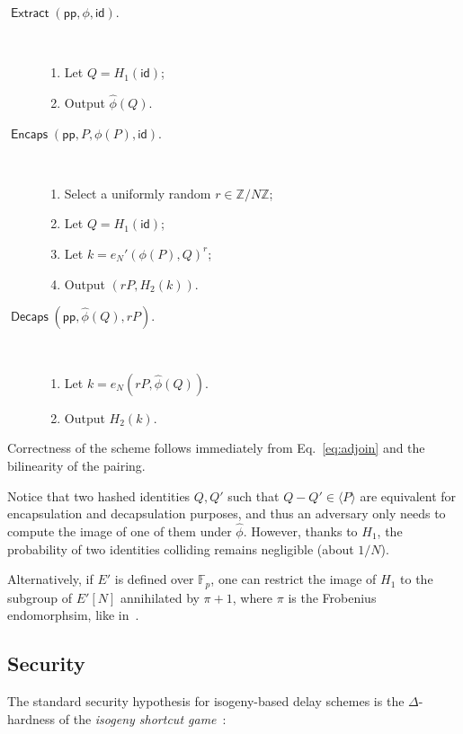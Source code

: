 \documentclass{llncs}
\newcommand{\Z}{\mathbb{Z}}
\newcommand{\F}{\mathbb{F}}
\DeclareMathOperator{\Extract}{\mathsf{Extract}}
\DeclareMathOperator{\Encaps}{\mathsf{Encaps}}
\DeclareMathOperator{\Decaps}{\mathsf{Decaps}}
\newcommand{\pp}{\mathsf{pp}}
\newcommand{\id}{\mathsf{id}}
\begin{document}
\begin{description}
\item[$\Extract(\pp,\phi,\id)$.]\
  \begin{enumerate}
  \item Let $Q = H_1(\id)$;
  \item Output $\hat\phi(Q)$.
  \end{enumerate}
\item[$\Encaps(\pp,P,\phi(P),\id)$.]\
  \begin{enumerate}
  \item Select a uniformly random $r\in\Z/N\Z$;
  \item Let $Q = H_1(\id)$;
  \item Let $k=e_N'(\phi(P),Q)^r$;
  \item Output $(rP,H_2(k))$.
  \end{enumerate}
\item[$\Decaps(\pp,\hat\phi(Q),rP)$.]\
  \begin{enumerate}
  \item Let $k = e_N(rP,\hat\phi(Q))$.
  \item Output $H_2(k)$.
  \end{enumerate}
\end{description}

Correctness of the scheme follows immediately from
Eq.~\eqref{eq:adjoin} and the bilinearity of the pairing. %

\begin{remark}
  Notice that two hashed identities $Q,Q'$ such that
  $Q-Q'\in \langle P\rangle$ are equivalent for encapsulation and
  decapsulation purposes, and thus an adversary only needs to compute
  the image of one of them under $\hat\phi$. %
  However, thanks to $H_1$, the probability of two identities
  colliding remains negligible (about $1/N$).
  
  Alternatively, if $E'$ is defined over $\F_p$, one can restrict the
  image of $H_1$ to the subgroup of $E'[N]$ annihilated by $\pi+1$,
  where $\pi$ is the Frobenius endomorphsim, like
  in~\cite{10.1007/978-3-030-34578-5_10}.
\end{remark}


\subsection{Security}

The standard security hypothesis for isogeny-based delay schemes is
the $\Delta$-hardness of the \emph{isogeny shortcut
  game}~\cite{10.1007/978-3-030-34578-5_10}:
\end{document}
